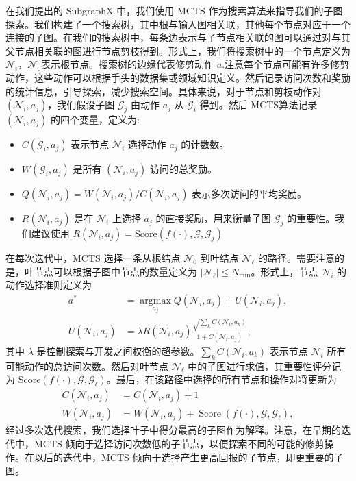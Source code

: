 \documentclass[final]{cvpr}
\begin{document}
在我们提出的 SubgraphX 中，我们使用 MCTS 作为搜索算法来指导我们的子图探索。我们构建了一个搜索树，其中根与输入图相关联，其他每个节点对应于一个连接的子图。在我们的搜索树中，每条边表示与子节点相关联的图可以通过对与其父节点相关联的图进行节点剪枝得到。形式上，我们将搜索树中的一个节点定义为 $\mathcal{N}_i$，$\mathcal{N}_0$表示根节点。搜索树的边缘代表修剪动作 $a$.注意每个节点可能有许多修剪动作，这些动作可以根据手头的数据集或领域知识定义。然后记录访问次数和奖励的统计信息，引导探索，减少搜索空间。具体来说，对于节点和剪枝动作对 $(\mathcal{N}_i,a_j)$，我们假设子图 $\mathcal{G}_j$ 由动作 $a_j$ 从 $\mathcal{G}_i$ 得到。然后 MCTS算法记录 $(\mathcal{N}_i, a_j)$ 的四个变量，定义为:
%
\begin{itemize}
\item $C(\mathcal{G}_i,a_j)$ 表示节点 $\mathcal{N}_i$ 选择动作 $a_j$ 的计数数。
\item $W(\mathcal{G}_i,a_j)$ 是所有 $(\mathcal{N}_i, a_j)$ 访问的总奖励。
\item $Q(\mathcal{N}_i,a_j)=W(\mathcal{N}_i,a_j)/C(\mathcal{N}_i,a_j)$ 表示多次访问的平均奖励。
\item $R(\mathcal{N}_i,a_j)$ 是在 $\mathcal{N}_i$ 上选择 $a_j$ 的直接奖励，用来衡量子图 $\mathcal{G}_j$ 的重要性。我们建议使用 $R(\mathcal{N}_i,a_j)=\mathrm{Score}(f(\cdot),\mathcal{G},\mathcal{G}_j)$
\end{itemize}
%
在每次迭代中，MCTS 选择一条从根结点 $\mathcal{N}_0$ 到叶结点 $\mathcal{N}_{\ell}$ 的路径。需要注意的是，叶节点可以根据子图中节点的数量定义为 $|\mathcal{N}_{\ell}|\le N_{\min}$。形式上，节点 $\mathcal{N}_i$ 的动作选择准则定义为
%
\begin{align}
a^{*} &= \underset{a_{j}}{\operatorname{argmax}} Q\left(\mathcal{N}_{i}, a_{j}\right)+U\left(\mathcal{N}_{i}, a_{j}\right), \\
U\left(\mathcal{N}_{i}, a_{j}\right) &= \lambda R\left(\mathcal{N}_{i}, a_{j}\right) \frac{\sqrt{\sum_{k} C\left(\mathcal{N}_{i}, a_{k}\right)}}{1+C\left(\mathcal{N}_{i}, a_{j}\right)},
\end{align}
%
其中 $\lambda$ 是控制探索与开发之间权衡的超参数。$\sum_kC(\mathcal{N}_i, a_k)$ 表示节点 $\mathcal{N}_i$ 所有可能动作的总访问次数。然后对叶节点 $\mathcal{N}_{\ell}$ 中的子图进行求值，其重要性评分记为 $\mathrm{Score}(f(\cdot),\mathcal{G},\mathcal{G}_{\ell})$。最后，在该路径中选择的所有节点和操作对将更新为
%
\begin{align}
C\left(\mathcal{N}_{i}, a_{j}\right) &=C\left(\mathcal{N}_{i}, a_{j}\right)+1 \\
W\left(\mathcal{N}_{i}, a_{j}\right) &=W\left(\mathcal{N}_{i}, a_{j}\right)+\operatorname{Score}\left(f(\cdot), \mathcal{G}, \mathcal{G}_{\ell}\right),
\end{align}
%
经过多次迭代搜索，我们选择叶子中得分最高的子图作为解释。注意，在早期的迭代中，MCTS 倾向于选择访问次数低的子节点，以便探索不同的可能的修剪操作。在以后的迭代中，MCTS 倾向于选择产生更高回报的子节点，即更重要的子图。
\end{document}

